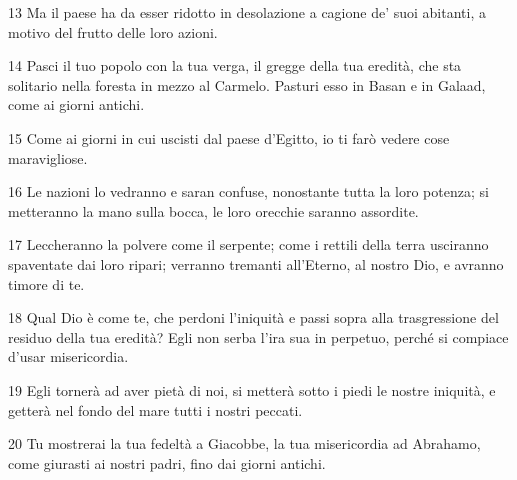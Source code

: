 \par 13 Ma il paese ha da esser ridotto in desolazione a cagione de' suoi abitanti, a motivo del frutto delle loro azioni.
\par 14 Pasci il tuo popolo con la tua verga, il gregge della tua eredità, che sta solitario nella foresta in mezzo al Carmelo. Pasturi esso in Basan e in Galaad, come ai giorni antichi.
\par 15 Come ai giorni in cui uscisti dal paese d'Egitto, io ti farò vedere cose maravigliose.
\par 16 Le nazioni lo vedranno e saran confuse, nonostante tutta la loro potenza; si metteranno la mano sulla bocca, le loro orecchie saranno assordite.
\par 17 Leccheranno la polvere come il serpente; come i rettili della terra usciranno spaventate dai loro ripari; verranno tremanti all'Eterno, al nostro Dio, e avranno timore di te.
\par 18 Qual Dio è come te, che perdoni l'iniquità e passi sopra alla trasgressione del residuo della tua eredità? Egli non serba l'ira sua in perpetuo, perché si compiace d'usar misericordia.
\par 19 Egli tornerà ad aver pietà di noi, si metterà sotto i piedi le nostre iniquità, e getterà nel fondo del mare tutti i nostri peccati.
\par 20 Tu mostrerai la tua fedeltà a Giacobbe, la tua misericordia ad Abrahamo, come giurasti ai nostri padri, fino dai giorni antichi.


